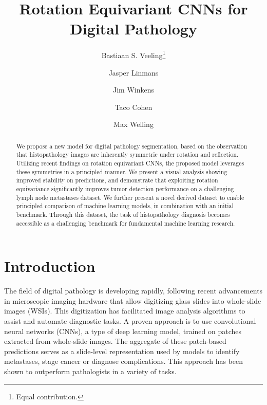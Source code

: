 \documentclass{llncs}
\newcommand*\samethanks[1][\value{footnote}]{\footnotemark[#1]}
\begin{document}
\title{Rotation Equivariant CNNs for Digital Pathology}




\author{Bastiaan S. Veeling\thanks{Equal contribution.}\and Jasper Linmans\samethanks  \and Jim Winkens\samethanks 
\and Taco Cohen \and Max Welling}







\maketitle             










\begin{abstract}
We propose a new model for digital pathology segmentation, based on the observation that histopathology images are inherently symmetric under rotation and reflection.  Utilizing recent findings on rotation equivariant CNNs, the proposed model leverages these symmetries in a principled manner. We present a visual analysis showing improved stability on predictions, and demonstrate that exploiting rotation equivariance significantly improves tumor detection performance on a challenging lymph node metastases dataset. We further present a novel derived dataset to enable principled comparison of machine learning models, in combination with an initial benchmark. Through this dataset, the task of histopathology diagnosis becomes accessible as a challenging benchmark for fundamental machine learning research.
\end{abstract}


\section{Introduction}







    The field of digital pathology is developing rapidly, following recent advancements in microscopic imaging hardware that allow digitizing glass slides into whole-slide images (WSIs). This digitization has facilitated image analysis algorithms to assist and automate diagnostic tasks. A proven approach is to use convolutional neural networks (CNNs), a type of deep learning model, trained on patches extracted from whole-slide images. The aggregate of these patch-based predictions serves as a slide-level representation used by models to identify metastases, stage cancer or diagnose complications. This approach has been shown to outperform pathologists in a variety of tasks\cite{Liu2017-jq,Litjens2017-zt,Bejnordi2016-fj}.
    
\end{document}
